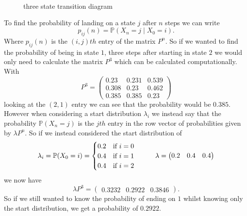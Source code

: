 \documentclass[11pt,a4paper]{article}
\begin{document}
\begin{figure}[h]
\centering
{}
\caption{three state transition diagram}
\label{fig:3 state td}
\end{figure}
\noindent
To find the probability of landing on a state $j$ after $n$ steps we can write \[ p_{ij}(n) = \mathbb{P}(X_n=j \mid X_0 = i).\]
Where $p_{ij}(n)$ is the $(i,j)th$ entry of the matrix $P^n$. So if we wanted to find the probability of being in state $1$, three steps after starting in state $2$ we would only need to calculate the matrix $P^3$ which can be calculated computationally. With \[P^3 = \begin{pmatrix}
    0.23 &0.231&0.539\\
 0.308&0.23 &0.462\\
 0.385&0.385&0.23 
\end{pmatrix}\]
looking at the $(2,1)$ entry we can see that the probability would be $0.385$. However when considering a start distribution $\lambda_i$ we instead say that the probability $\mathbb{P}(X_n=j)$ is the $jth$ entry in the row vector of probabilities given by $\lambda P^n$. So if we instead considered the start distribution of \[ \lambda_i =\mathbb{P}(X_0 =i)=\begin{cases}
    0.2& \text{if }i=0\\
    0.4& \text{if }i=1\\
    0.4& \text{if }i=2
\end{cases} \hspace{10mm}\lambda = \begin{pmatrix}
    0.2&0.4&0.4
\end{pmatrix}\]
we now have \[\lambda P^3 = \begin{pmatrix}
    0.3232&0.2922&0.3846
\end{pmatrix}.\]
So if we still wanted to know the probability of ending on $1$ whilst knowing only the start distribution, we get a probability of $0.2922$.
\end{document}
